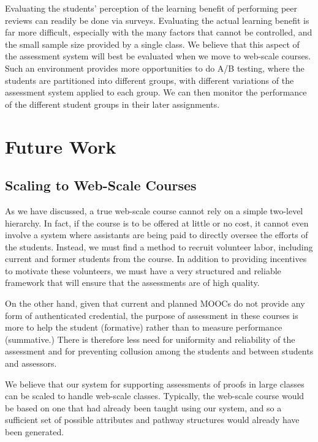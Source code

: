\documentclass[12pt]{article}
\begin{document}
Evaluating the students' perception of the learning benefit of
performing peer reviews can readily be done via surveys.  Evaluating
the actual learning benefit is far more difficult, especially with the
many factors that cannot be controlled, and the small sample size
provided by a single class.  We believe that this aspect of
the assessment system will best be evaluated when we move to
web-scale courses.  Such an environment provides more opportunities to
do A/B testing, where the students are partitioned into different
groups, with different variations of the assessment system applied to
each group.  We can then monitor the performance of the different
student groups in their later assignments.

\section{Future Work}

\subsection{Scaling to Web-Scale Courses}

As we have discussed, a true web-scale course cannot rely on a simple
two-level hierarchy.  In fact, if the course is to be offered at
little or no cost, it cannot even involve a system where assistants
are being paid to directly oversee the efforts of the students.
Instead, we must find a method to recruit volunteer labor, including
current and former students from the course.  In addition to providing
incentives to motivate these volunteers, we must have a very
structured and reliable framework that will ensure that the
assessments are of high quality.

On the other hand, given that current and planned MOOCs do not provide
any form of authenticated credential, the purpose of assessment in
these courses is more to help the student (formative) rather than to
measure performance (summative.)  There is therefore less need for
uniformity and reliability of the assessment and for preventing
collusion among the students and between students and assessors.

We believe that our system for supporting assessments of proofs in
large classes can be scaled to handle web-scale classes.  Typically,
the web-scale course would be based on one that had already been
taught using our system, and so a sufficient set of possible attributes and
pathway structures would already have been generated.
\end{document}
